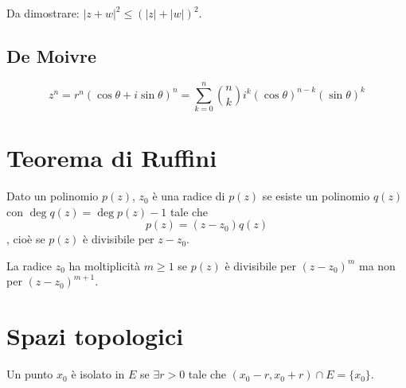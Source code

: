 \documentclass[a4paper]{article}
\begin{document}
Da dimostrare: \(|z+w|^2 \leq {(|z| + |w|)}^2\).

\subsection{De Moivre}

\[
    z^n = r^n {(\cos \theta + i\sin\theta)}^n = \sum_{k=0}^n \binom{n}{k}
    i^k {(\cos\theta)}^{n-k}{(\sin\theta)}^k
\]

\section{Teorema di Ruffini}

Dato un polinomio \(p(z)\), \(z_0\) è una radice di \(p(z)\) se esiste
un polinomio \(q(z)\) con \(\deg q(z) = \deg p(z) - 1\)
tale che \[p(z) = (z-z_0)q(z)\], cioè se \(p(z)\) è divisibile per \(z-z_0\).

La radice \(z_0\) ha moltiplicità \(m \geq 1\) se
\(p(z)\) è divisibile per \((z-z_0)^m\) ma non per \((z-z_0)^{m+1}\).


\pagebreak

\section{Spazi topologici}

Un punto \(x_0\) è isolato in \(E\) se \(\exists r > 0\) tale che \((x_0 - r, x_0 + r) \cap E = \{x_0\}\).

\end{document}
